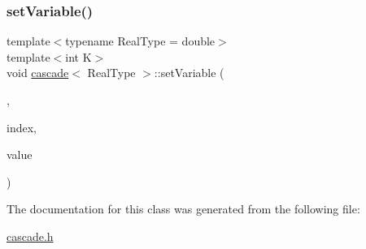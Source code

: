 \mbox{\label{classcascade_a2195202880e150925ff465597830981c}} 
\subsubsection{\texorpdfstring{set\+Variable()}{setVariable()}}
{\footnotesize\ttfamily template$<$typename Real\+Type = double$>$ \\
template$<$int K$>$ \\
void \mbox{\hyperlink{classcascade}{cascade}}$<$ Real\+Type $>$\+::set\+Variable (\begin{DoxyParamCaption}\item[{Var\+Group$<$ K $>$}]{,  }\item[{const int}]{index,  }\item[{const Real\+Type \&}]{value }\end{DoxyParamCaption})\hspace{0.3cm}{\ttfamily [inline]}}



The documentation for this class was generated from the following file\+:\begin{DoxyCompactItemize}
\item 
\mbox{\hyperlink{cascade_8h}{cascade.\+h}}\end{DoxyCompactItemize}
